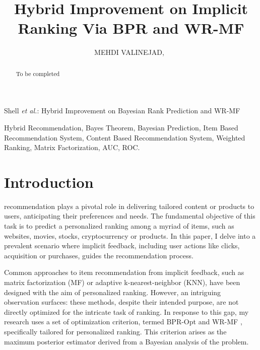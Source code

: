 \documentclass[journal]{IEEEtran}
\begin{document}

\title{Hybrid Improvement on Implicit Ranking Via BPR and WR-MF}

\author{MEHDI VALINEJAD,~}%

%
{Shell \MakeLowercase{\textit{et al.}}: Hybrid Improvement on Bayesian Rank Prediction and WR-MF}

\maketitle

\begin{abstract}
To be completed
\end{abstract}

\begin{IEEEkeywords}
Hybrid Recommendation, Bayes Theorem, Bayesian Prediction, Item Based Recommendation System, Content Based Recommendation System, Weighted Ranking, Matrix Factorization, AUC, ROC.
\end{IEEEkeywords}

\IEEEpeerreviewmaketitle

\section{Introduction}

 recommendation plays a pivotal role in delivering tailored content or products to users, anticipating their preferences and needs. 
The fundamental objective of this task is to predict a personalized ranking among a myriad of items, such as websites, movies, stocks, cryptocurrency or products. 
In this paper, I delve into a prevalent scenario where implicit feedback, including user actions like clicks, acquisition or purchases, guides the 
recommendation process.

Common approaches to item recommendation from implicit feedback, such as matrix factorization (MF) or adaptive k-nearest-neighbor (KNN), 
have been designed with the aim of personalized ranking. However, an intriguing observation surfaces: these methods, despite their 
intended purpose, are not directly optimized for the intricate task of ranking. In response to this gap, my research uses a set of
optimization criterion, termed BPR-Opt \cite{rendle2012bpr} and WR-MF \cite{8252119}, specifically tailored for personalized ranking. 
This criterion arises as the maximum posterior estimator derived from a Bayesian analysis of the problem.
\end{document}
